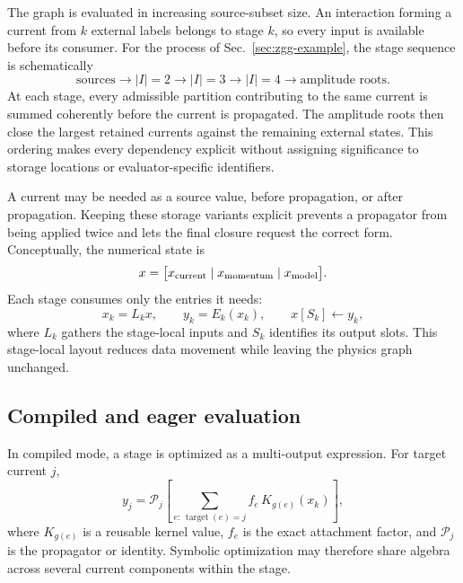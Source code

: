 The graph is evaluated in increasing source-subset size.  An interaction
forming a current from \(k\) external labels belongs to stage \(k\), so every
input is available before its consumer.  For the process of
Sec.~\ref{sec:zgg-example}, the stage sequence is schematically
\begin{equation}
 \boxed{\text{sources}}
 \longrightarrow
 \boxed{|I|=2}
 \longrightarrow
 \boxed{|I|=3}
 \longrightarrow
 \boxed{|I|=4}
 \longrightarrow
 \boxed{\text{amplitude roots}} .
 \label{eq:zgg-stage-chain}
\end{equation}
At each stage, every admissible partition contributing to the same current is
summed coherently before the current is propagated. The amplitude roots then
close the largest retained currents against the remaining external states.
This ordering makes every dependency explicit without assigning significance
to storage locations or evaluator-specific identifiers.

A current may be needed as a source value, before propagation, or after
propagation.  Keeping these storage variants explicit prevents a propagator
from being applied twice and lets the final closure request the correct form.
Conceptually, the numerical state is
\begin{equation}
  x=\bigl[x_{\rm current}\mid x_{\rm momentum}\mid x_{\rm model}\bigr].
  \label{eq:zgg-global-state}
\end{equation}
Each stage consumes only the entries it needs:
\begin{equation}
  x_k=L_k x,\qquad y_k=E_k(x_k),\qquad
  x[S_k]\mathrel{\leftarrow}y_k ,
  \label{eq:zgg-stage-map}
\end{equation}
where \(L_k\) gathers the stage-local inputs and \(S_k\) identifies its output
slots.  This stage-local layout reduces data movement while leaving the
physics graph unchanged.

\subsection{Compiled and eager evaluation}

In compiled mode, a stage is optimized as a multi-output expression.  For
target current \(j\),
\begin{equation}
  y_j=\mathcal P_j\!\left[
       \sum_{e:\,\operatorname{target}(e)=j}
       f_e\,K_{g(e)}(x_k)
     \right],
  \label{eq:zgg-stage-expression}
\end{equation}
where \(K_{g(e)}\) is a reusable kernel value, \(f_e\) is the exact attachment
factor, and \(\mathcal P_j\) is the propagator or identity.  Symbolic
optimization may therefore share algebra across several current components
within the stage.

